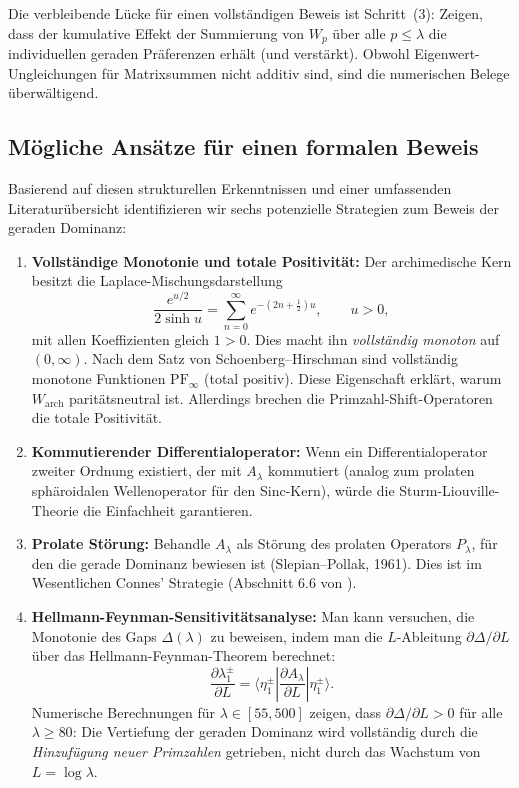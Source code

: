 \documentclass[12pt,a4paper]{article}
\theoremstyle{definition}
\theoremstyle{remark}
\begin{document}
Die verbleibende Lücke für einen vollständigen Beweis ist Schritt~(3): Zeigen, dass der kumulative Effekt der Summierung von $W_p$ über alle $p \leq \lambda$ die individuellen geraden Präferenzen erhält (und verstärkt). Obwohl Eigenwert-Ungleichungen für Matrixsummen nicht additiv sind, sind die numerischen Belege überwältigend.

\subsection{Mögliche Ansätze für einen formalen Beweis}

Basierend auf diesen strukturellen Erkenntnissen und einer umfassenden Literaturübersicht identifizieren wir sechs potenzielle Strategien zum Beweis der geraden Dominanz:

\begin{enumerate}[label=(\Alph*)]
  \item \textbf{Vollständige Monotonie und totale Positivität:} Der archimedische Kern besitzt die Laplace-Mischungsdarstellung
  \[ \frac{e^{u/2}}{2\sinh u} = \sum_{n=0}^\infty e^{-(2n+\frac{1}{2})u}, \qquad u > 0, \]
  mit allen Koeffizienten gleich $1 > 0$. Dies macht ihn \emph{vollständig monoton} auf $(0,\infty)$. Nach dem Satz von Schoenberg--Hirschman sind vollständig monotone Funktionen $\mathrm{PF}_\infty$ (total positiv). Diese Eigenschaft erklärt, warum $W_{\mathrm{arch}}$ paritätsneutral ist. Allerdings brechen die Primzahl-Shift-Operatoren die totale Positivität.

  \item \textbf{Kommutierender Differentialoperator:} Wenn ein Differentialoperator zweiter Ordnung existiert, der mit $A_\lambda$ kommutiert (analog zum prolaten sphäroidalen Wellenoperator für den Sinc-Kern), würde die Sturm-Liouville-Theorie die Einfachheit garantieren.

  \item \textbf{Prolate Störung:} Behandle $A_\lambda$ als Störung des prolaten Operators $P_\lambda$, für den die gerade Dominanz bewiesen ist (Slepian--Pollak, 1961). Dies ist im Wesentlichen Connes' Strategie (Abschnitt 6.6 von \cite{Connes2025}).

  \item \textbf{Hellmann-Feynman-Sensitivitätsanalyse:} Man kann versuchen, die Monotonie des Gaps $\Delta(\lambda)$ zu beweisen, indem man die $L$-Ableitung $\partial\Delta/\partial L$ über das Hellmann-Feynman-Theorem berechnet:
  \[ \frac{\partial \lambda_1^\pm}{\partial L} = \langle \eta_1^\pm | \frac{\partial A_\lambda}{\partial L} | \eta_1^\pm \rangle. \]
  Numerische Berechnungen für $\lambda \in [55, 500]$ zeigen, dass $\partial\Delta/\partial L > 0$ für alle $\lambda \geq 80$: Die Vertiefung der geraden Dominanz wird vollständig durch die \emph{Hinzufügung neuer Primzahlen} getrieben, nicht durch das Wachstum von $L = \log\lambda$.
\end{enumerate}
\end{document}

